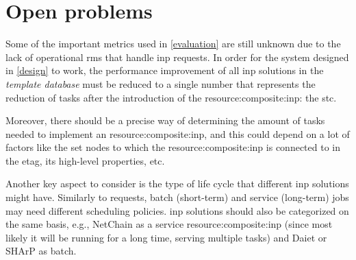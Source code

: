 \section{Open problems}
Some of the important metrics used in \autoref{evaluation} are still unknown due to the lack of operational \glspl{rm} that handle \gls{inp} requests.
In order for the system designed in \autoref{design} to work, the performance improvement of all \gls{inp} solutions in the \textit{template database} must be reduced to a single number that represents the reduction of  tasks after the introduction of the \gls{resource:composite:inp}: the \gls{stc}.

Moreover, there should be a precise way of determining the amount of  tasks needed to implement an \gls{resource:composite:inp}, and this could depend on a lot of factors like the set nodes to which the \gls{resource:composite:inp} is connected to in the \gls{etag}, its high-level properties, etc.

Another key aspect to consider is the type of life cycle that different \gls{inp} solutions might have.
Similarly to  requests, batch (short-term) and service (long-term) jobs may need different scheduling policies.
\gls{inp} solutions should also be categorized on the same basis, e.g., NetChain \cite{netchain} as a service \gls{resource:composite:inp} (since most likely it will be running for a long time, serving multiple  tasks) and Daiet \cite{daiet} or SHArP \cite{sharp} as batch.